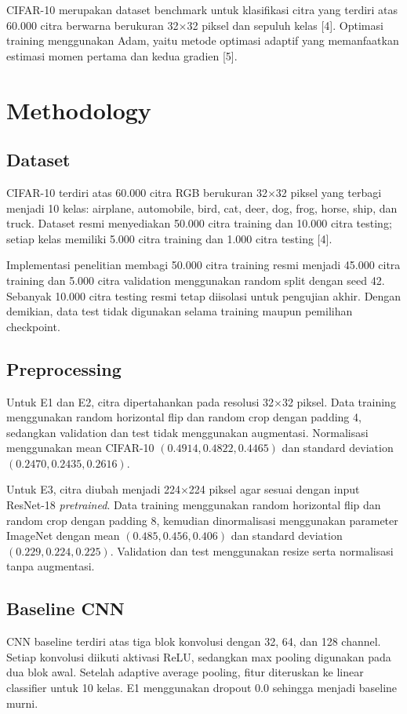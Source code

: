 \documentclass[conference,a4paper]{IEEEtran}
\begin{document}
CIFAR-10 merupakan dataset benchmark untuk klasifikasi citra yang terdiri atas 60.000 citra berwarna berukuran 32$\times$32 piksel dan sepuluh kelas [4]. Optimasi training menggunakan Adam, yaitu metode optimasi adaptif yang memanfaatkan estimasi momen pertama dan kedua gradien [5].

\section{Methodology}
\subsection{Dataset}
CIFAR-10 terdiri atas 60.000 citra RGB berukuran 32$\times$32 piksel yang terbagi menjadi 10 kelas: airplane, automobile, bird, cat, deer, dog, frog, horse, ship, dan truck. Dataset resmi menyediakan 50.000 citra training dan 10.000 citra testing; setiap kelas memiliki 5.000 citra training dan 1.000 citra testing [4].

Implementasi penelitian membagi 50.000 citra training resmi menjadi 45.000 citra training dan 5.000 citra validation menggunakan random split dengan seed 42. Sebanyak 10.000 citra testing resmi tetap diisolasi untuk pengujian akhir. Dengan demikian, data test tidak digunakan selama training maupun pemilihan checkpoint.

\subsection{Preprocessing}
Untuk E1 dan E2, citra dipertahankan pada resolusi 32$\times$32 piksel. Data training menggunakan random horizontal flip dan random crop dengan padding 4, sedangkan validation dan test tidak menggunakan augmentasi. Normalisasi menggunakan mean CIFAR-10 $(0.4914, 0.4822, 0.4465)$ dan standard deviation $(0.2470, 0.2435, 0.2616)$.

Untuk E3, citra diubah menjadi 224$\times$224 piksel agar sesuai dengan input ResNet-18 \textit{pretrained}. Data training menggunakan random horizontal flip dan random crop dengan padding 8, kemudian dinormalisasi menggunakan parameter ImageNet dengan mean $(0.485, 0.456, 0.406)$ dan standard deviation $(0.229, 0.224, 0.225)$. Validation dan test menggunakan resize serta normalisasi tanpa augmentasi.

\subsection{Baseline CNN}
CNN baseline terdiri atas tiga blok konvolusi dengan 32, 64, dan 128 channel. Setiap konvolusi diikuti aktivasi ReLU, sedangkan max pooling digunakan pada dua blok awal. Setelah adaptive average pooling, fitur diteruskan ke linear classifier untuk 10 kelas. E1 menggunakan dropout 0.0 sehingga menjadi baseline murni.
\end{document}
